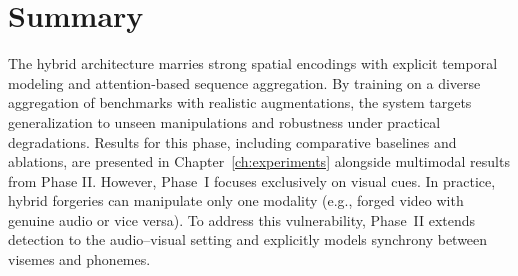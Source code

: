 \section{Summary}
The hybrid architecture marries strong spatial encodings with explicit temporal modeling and attention-based sequence aggregation. By training on a diverse aggregation of benchmarks with realistic augmentations, the system targets generalization to unseen manipulations and robustness under practical degradations. Results for this phase, including comparative baselines and ablations, are presented in Chapter~\ref{ch:experiments} alongside multimodal results from Phase II.
However, Phase~I focuses exclusively on visual cues. In practice, hybrid forgeries can manipulate only one modality (e.g., forged video with genuine audio or vice versa). To address this vulnerability, Phase~II extends detection to the audio–visual setting and explicitly models synchrony between visemes and phonemes.

\label{sec:methodology-visual}
